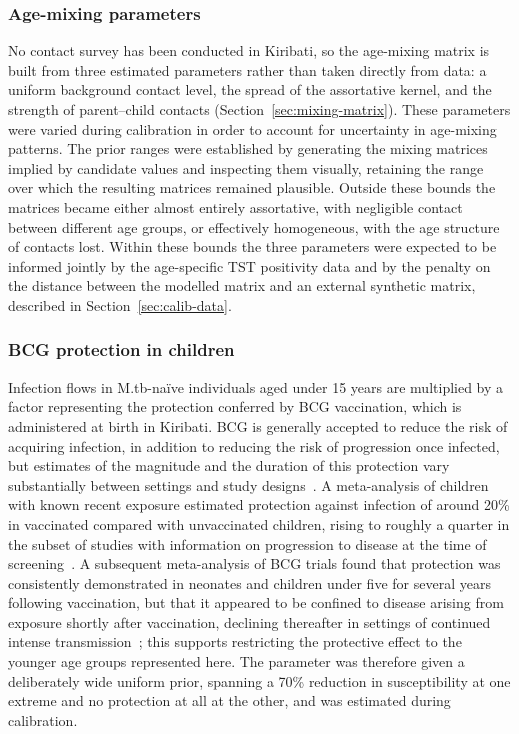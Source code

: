 \subsubsection{Age-mixing parameters}

No contact survey has been conducted in Kiribati, so the age-mixing matrix is built from three estimated parameters rather than taken directly from data: a uniform background contact level, the spread of the assortative kernel, and the strength of parent--child contacts (Section~\ref{sec:mixing-matrix}). These parameters were varied during calibration in order to account for uncertainty in age-mixing patterns. The prior ranges were established by generating the mixing matrices implied by candidate values and inspecting them visually, retaining the range over which the resulting matrices remained plausible. Outside these bounds the matrices became either almost entirely assortative, with negligible contact between different age groups, or effectively homogeneous, with the age structure of contacts lost. Within these bounds the three parameters were expected to be informed jointly by the age-specific TST positivity data and by the penalty on the distance between the modelled matrix and an external synthetic matrix, described in Section~\ref{sec:calib-data}.

\subsubsection{BCG protection in children}

Infection flows in M.tb-na\"ive individuals aged under 15 years are multiplied by a factor representing the protection conferred by BCG vaccination, which is administered at birth in Kiribati. BCG is generally accepted to reduce the risk of acquiring infection, in addition to reducing the risk of progression once infected, but estimates of the magnitude and the duration of this protection vary substantially between settings and study designs~\cite{roy2014,pelzer2025,cai2025,trauer2021}. A meta-analysis of children with known recent exposure estimated protection against infection of around 20\% in vaccinated compared with unvaccinated children, rising to roughly a quarter in the subset of studies with information on progression to disease at the time of screening~\cite{roy2014}. A subsequent meta-analysis of BCG trials found that protection was consistently demonstrated in neonates and children under five for several years following vaccination, but that it appeared to be confined to disease arising from exposure shortly after vaccination, declining thereafter in settings of continued intense transmission~\cite{trauer2021}; this supports restricting the protective effect to the younger age groups represented here. The parameter was therefore given a deliberately wide uniform prior, spanning a 70\% reduction in susceptibility at one extreme and no protection at all at the other, and was estimated during calibration.

